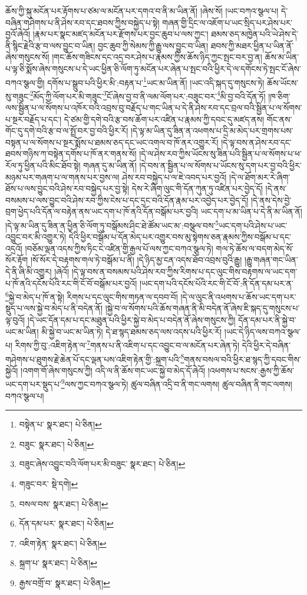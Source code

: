 ཆོས་ཀྱི་སྐུ་མངོན་པར་རྟོགས་པ་ཙམ་ལ་མངོན་པར་དགའ་བ་ནི་མ་ཡིན་ནོ། །ཞེས་སོ། །ཡང་བཀའ་སྩལ་པ། དེ་བཞིན་གཤེགས་པ་ནི་ཤེས་རབ་དང་ཐབས་ཀྱིས་བསྐྱེད་པ་སྟེ། གཞན་གྱི་དྲིང་ལ་འཇོག་པ་ཡང་སྲིད་པར་ཤེས་པར་བྱའོ་ཞེའོ། །རྣམ་པར་སྣང་མཛད་མངོན་པར་རྫོགས་པར་བྱང་ཆུབ་པ་ལས་ཀྱང་། ཐམས་ཅད་མཁྱེན་པའི་ཡེ་ཤེས་དེ་ནི་སྙིང་རྗེའི་རྩ་བ་ལས་བྱུང་བ་ཡིན། བྱང་ཆུབ་ཀྱི་སེམས་ཀྱི་རྒྱུ་ལས་བྱུང་བ་ཡིན། ཐབས་ཀྱི་མཐར་ཕྱིན་པ་ཡིན་ནོ་ཞེས་གསུངས་སོ། །གང་ཆོས་གཟིངས་དང་འདྲ་བར་ཤེས་པ་རྣམས་ཀྱིས་ཆོས་ཉིད་ཀྱང་སྤང་བར་བྱ་ན། ཆོས་མ་ཡིན་པ་ལྟ་ཅི་སྨོས་ཞེས་གསུངས་པ་དེ་ཡང་ཕྱིན་ཅི་ལོག་ཏུ་མངོན་པར་ཞེན་པ་སྤང་བའི་ཕྱིར་དེ་ལ་དགོངས་ཏེ་སྤང་ངོ་ཞེས་བཀའ་སྩལ་གྱི། དགོས་པ་སྒྲུབ་པའི་ཕྱིར་མི་:བརྟན་པ་\footnote{བསྟེན་པ་  སྣར་ཐང་།  པེ་ཅིན། }ཡང་མ་ཡིན་ནོ། །ཡང་འདི་སྐད་དུ་གསུངས་ཏེ། ཆོས་ཡོངས་སུ་གཟུང་\footnote{བཟུང་  སྣར་ཐང་།  པེ་ཅིན། }མོད་ཀྱི་ལོག་པར་མི་གཟུང་\footnote{བཟུང་ཞེས་འབྱུང་བའི་ལོག་པར་མི་བཟུང་  སྣར་ཐང་།  པེ་ཅིན། }ངོ་ཞེས་བྱ་བ་ནི་ལམ་ལོག་པར་:བཟུང་བར་\footnote{གཟུང་བར་  སྡེ་དགེ། }མི་བྱ་བའི་དོན་ཏོ། །ཁ་ཅིག་ལས་སྦྱིན་པ་ལ་སོགས་པ་འཁོར་བའི་འབྲས་བུ་བརྗོད་པ་གང་ཡིན་པ་དེ་ནི་ཤེས་རབ་དང་བྲལ་བའི་སྦྱིན་པ་ལ་སོགས་པ་སྔར་བརྗོད་པ་དང་། དེ་ཙམ་གྱི་དགེ་བའི་རྩ་བས་ཆོག་པར་འཛིན་པ་རྣམས་ཀྱི་དབང་དུ་མཛད་ནས། གོང་ནས་གོང་དུ་དགེ་བའི་རྩ་བ་ལ་སྤྲོ་བར་བྱ་བའི་ཕྱིར་རོ། །དེ་ལྟ་མ་ཡིན་དུ་ཟིན་ན་འཕགས་པ་དྲི་མ་མེད་པར་གྲགས་པས་བསྟན་པ་ལ་སོགས་པ་སྔར་སྨོས་པ་ཐམས་ཅད་དང་ཡང་འགལ་བ་ཁོ་ནར་འགྱུར་རོ། །དེ་ལྟ་བས་ན་ཤེས་རབ་དང་ཐབས་གཉིས་ཀ་བསྟེན་དགོས་པ་ཁོ་ནར་གནས་སོ། །དེ་ལ་ཤེས་རབ་ཀྱིས་ཡོངས་སུ་ཟིན་པའི་སྦྱིན་པ་ལ་སོགས་པ་ཕ་རོལ་ཏུ་ཕྱིན་པའི་མིང་ཐོབ་སྟེ། གཞན་དུ་མ་ཡིན་ནོ། །དེ་བས་ན་སྦྱིན་པ་ལ་སོགས་པ་ཡོངས་སུ་དག་པར་བྱ་བའི་ཕྱིར་མཉམ་པར་གཞག་པ་ལ་གནས་པར་བྱས་ལ། ཤེས་རབ་བསྐྱེད་པ་ལ་ཇེ་འབད་པར་བྱའོ། །དེ་ལ་ཐོག་མར་རེ་ཞིག་ཐོས་པ་ལས་བྱུང་བའི་ཤེས་རབ་བསྐྱེད་པར་བྱ་སྟེ། དེས་རེ་ཞིག་ལུང་གི་དོན་ཀུན་ཏུ་འཛིན་པར་བྱེད་དོ། །དེ་ནས་བསམས་པ་ལས་བྱུང་བའི་ཤེས་རབ་ཀྱིས་ངེས་པ་དང་དྲང་བའི་དོན་རྣམ་པར་འབྱེད་པར་བྱེད་དོ། །དེ་ནས་དེས་བྱེ་བྲག་ཕྱེད་པའི་དོན་ལ་བརྟེན་ནས་ཡང་དག་པ་ཁོ་ནའི་དོན་བསྒོམ་པར་བྱའི། ཡང་དག་པ་མ་ཡིན་པ་དེ་ནི་མ་ཡིན་ནོ། །དེ་ལྟ་མ་ཡིན་དུ་ཟིན་ན་ཕྱིན་ཅི་ལོག་ཏུ་བསྒོམས་ཤིང་ཐེ་ཚོམ་ཡང་མ་:བསྩལ་བས་\footnote{བསལ་བས་  སྣར་ཐང་།  པེ་ཅིན། }ཡང་དག་པའི་ཤེས་པ་ཡང་འབྱུང་བར་མི་འགྱུར་ཏེ། དེའི་ཕྱིར་བསྒོམ་པ་དོན་མེད་པར་འགྱུར་བས་མུ་སྟེགས་ཅན་རྣམས་ཀྱིས་བསྒོམ་པ་དང་འདྲའོ། །བཅོམ་ལྡན་འདས་ཀྱིས་ཏིང་ངེ་འཛིན་གྱི་རྒྱལ་པོ་ལས་ཀྱང་བཀའ་སྩལ་ཏེ། གལ་ཏེ་ཆོས་ལ་བདག་མེད་སོ་སོར་རྟོག །སོ་སོར་དེ་བརྟགས་གལ་ཏེ་བསྒོམ་པ་ནི། །དེ་ཉིད་མྱ་ངན་འདས་ཐོབ་འབྲས་བུའི་རྒྱུ། །རྒྱུ་གཞན་གང་ཡིན་དེ་ནི་ཞི་མི་འགྱུར། །ཞེའོ། །དེ་ལྟ་བས་ན་བསམས་པའི་ཤེས་རབ་ཀྱིས་རིགས་པ་དང་ལུང་གིས་བརྟགས་ལ་ཡང་དག་པ་ཁོ་ནའི་དངོས་པོའི་རང་གི་ངོ་བོ་བསྒོམ་པར་བྱའོ། །ཡང་དག་པའི་དངོས་པོའི་རང་གི་ངོ་བོ་:ནི་དོན་དམ་པར་ན་\footnote{དོན་དམ་པར་  སྣར་ཐང་།  པེ་ཅིན། }སྐྱེ་བ་མེད་པ་ཁོ་ན་སྟེ། རིགས་པ་དང་ལུང་གིས་གཏན་ལ་དབབ་བོ། །དེ་ལ་ལུང་ནི་འཕགས་པ་ཆོས་ཡང་དག་པར་སྡུད་པ་ལས་སྐྱེ་བ་མེད་པ་ནི་བདེན་ནོ། །སྐྱེ་བ་ལ་སོགས་པའི་ཆོས་གཞན་ནི་མི་བདེན་ནོ་ཞེས་ཇི་སྐད་དུ་གསུངས་པ་ལྟ་བུའོ། །དེ་ཡང་དོན་དམ་པ་དང་མཐུན་པའི་ཕྱིར་སྐྱེ་བ་མེད་པ་བདེན་ནོ་ཞེས་གསུངས་ཀྱི། དོན་དམ་པར་ནི་སྐྱེ་བ་ཡང་མ་ཡིན། མི་སྐྱེ་བ་ཡང་མ་ཡིན་ཏེ། དེ་ཐ་སྙད་ཐམས་ཅད་ལས་འདས་པའི་ཕྱིར་རོ། །ཡང་དེ་ཉིད་ལས་བཀའ་སྩལ་པ། རིགས་ཀྱི་བུ་:འཇིག་རྟེན་ལ་\footnote{འཇིག་རྟེན་  སྣར་ཐང་།  པེ་ཅིན། }གནས་པ་ནི་འཇིག་པ་དང་འབྱུང་བ་ལ་མངོན་པར་ཞེན་ཏེ། དེའི་ཕྱིར་དེ་བཞིན་གཤེགས་པ་ཐུགས་རྗེ་ཆེན་པོ་དང་ལྡན་པས་འཇིག་རྟེན་གྱི་:སྐྲག་པའི་\footnote{སྐྲག་པ་  སྣར་ཐང་།  པེ་ཅིན། }གནས་བསལ་བའི་ཕྱིར་ཐ་སྙད་ཀྱི་དབང་གིས་སྐྱེའོ། །འགག་གོ་ཞེས་གསུངས་ཀྱི། འདི་ལ་ནི་ཆོས་གང་ཡང་སྐྱེ་བ་མེད་དོ་ཞེའོ། །འཕགས་པ་སངས་:རྒྱས་ཀྱི་ཆོས་ཡང་དག་པར་སྡུད་པ་\footnote{རྒྱས་བགྲོ་བ་  སྣར་ཐང་།  པེ་ཅིན། }ལས་ཀྱང་བཀའ་སྩལ་ཏེ། ཚུལ་བཞིན་འདྲི་བ་ནི་གང་ལགས། ཚུལ་བཞིན་ནི་གང་ལགས། བཀའ་སྩལ་པ། 